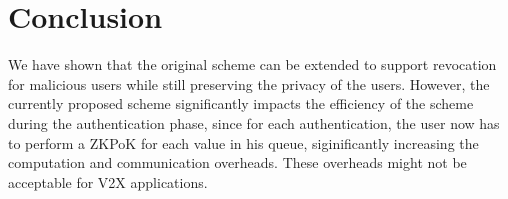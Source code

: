 \documentclass[12pt]{article}
\begin{document}
\pagebreak
\section{Conclusion}
We have shown that the original scheme\cite*{Kanchan} can be extended to support revocation for malicious users while still preserving the privacy of the users. However, the currently proposed scheme significantly impacts the efficiency of the scheme during the authentication phase, since for each authentication, the user now has to perform a ZKPoK for each value in his queue, siginificantly increasing the computation and communication overheads. These overheads might not be acceptable for V2X applications.

\printbibliography
\end{document}
